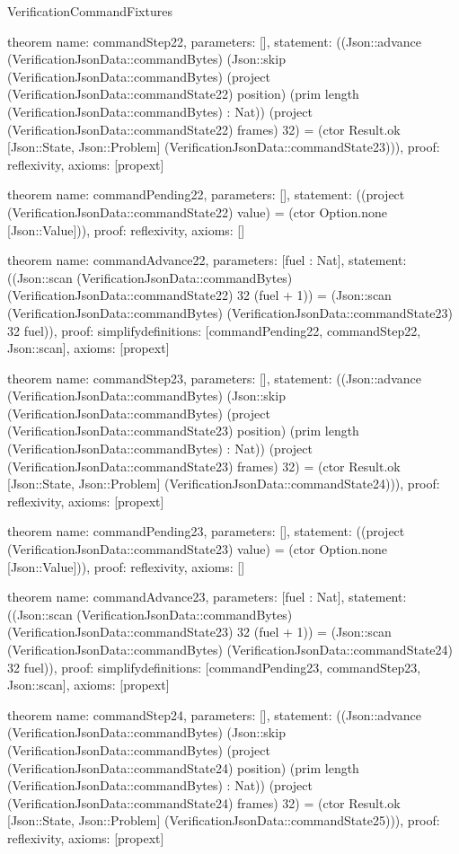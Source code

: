 \begin{lexlean}{VerificationCommandFixtures}
\begin{semanticmodule}
theorem{
  name: commandStep22,
  parameters: [],
  statement: ((Json::advance (VerificationJsonData::commandBytes) (Json::skip (VerificationJsonData::commandBytes) (project (VerificationJsonData::commandState22) position) (prim length (VerificationJsonData::commandBytes) : Nat)) (project (VerificationJsonData::commandState22) frames) 32) = (ctor Result.ok [Json::State, Json::Problem] (VerificationJsonData::commandState23))),
  proof: reflexivity{},
  axioms: [propext]
}

theorem{
  name: commandPending22,
  parameters: [],
  statement: ((project (VerificationJsonData::commandState22) value) = (ctor Option.none [Json::Value])),
  proof: reflexivity{},
  axioms: []
}

theorem{
  name: commandAdvance22,
  parameters: [fuel : Nat],
  statement: ((Json::scan (VerificationJsonData::commandBytes) (VerificationJsonData::commandState22) 32 (fuel + 1)) = (Json::scan (VerificationJsonData::commandBytes) (VerificationJsonData::commandState23) 32 fuel)),
  proof: simplify{definitions: [commandPending22, commandStep22, Json::scan]},
  axioms: [propext]
}

theorem{
  name: commandStep23,
  parameters: [],
  statement: ((Json::advance (VerificationJsonData::commandBytes) (Json::skip (VerificationJsonData::commandBytes) (project (VerificationJsonData::commandState23) position) (prim length (VerificationJsonData::commandBytes) : Nat)) (project (VerificationJsonData::commandState23) frames) 32) = (ctor Result.ok [Json::State, Json::Problem] (VerificationJsonData::commandState24))),
  proof: reflexivity{},
  axioms: [propext]
}

theorem{
  name: commandPending23,
  parameters: [],
  statement: ((project (VerificationJsonData::commandState23) value) = (ctor Option.none [Json::Value])),
  proof: reflexivity{},
  axioms: []
}

theorem{
  name: commandAdvance23,
  parameters: [fuel : Nat],
  statement: ((Json::scan (VerificationJsonData::commandBytes) (VerificationJsonData::commandState23) 32 (fuel + 1)) = (Json::scan (VerificationJsonData::commandBytes) (VerificationJsonData::commandState24) 32 fuel)),
  proof: simplify{definitions: [commandPending23, commandStep23, Json::scan]},
  axioms: [propext]
}

theorem{
  name: commandStep24,
  parameters: [],
  statement: ((Json::advance (VerificationJsonData::commandBytes) (Json::skip (VerificationJsonData::commandBytes) (project (VerificationJsonData::commandState24) position) (prim length (VerificationJsonData::commandBytes) : Nat)) (project (VerificationJsonData::commandState24) frames) 32) = (ctor Result.ok [Json::State, Json::Problem] (VerificationJsonData::commandState25))),
  proof: reflexivity{},
  axioms: [propext]
}


\end{semanticmodule}
\end{lexlean}
